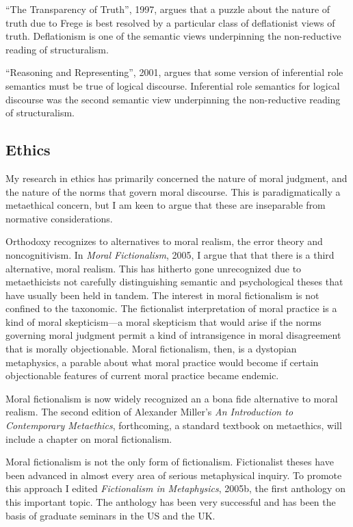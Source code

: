 \documentclass[contbibnum]{cv}
\begin{document}
``The Transparency of Truth'', 1997, argues that a puzzle about the nature of truth due to Frege is best resolved by a particular class of deflationist views of truth. Deflationism is one of the semantic views underpinning the non-reductive reading of structuralism.

``Reasoning and Representing'', 2001, argues that some version of inferential role semantics must be true of logical discourse. Inferential role semantics for logical discourse was the second semantic view underpinning the non-reductive reading of structuralism.


\subsection{Ethics}\label{sub:ethics} %

My research in ethics has primarily concerned the nature of moral judgment, and the nature of the norms that govern moral discourse. This is paradigmatically a metaethical concern, but I am keen to argue that these are inseparable from normative considerations.

Orthodoxy recognizes to alternatives to moral realism, the error theory and noncognitivism. In \emph{Moral Fictionalism}, 2005, I argue that that there is a third alternative, moral realism. This has hitherto gone unrecognized due to metaethicists not carefully distinguishing semantic and psychological theses that have usually been held in tandem. The interest in moral fictionalism is not confined to the taxonomic. The fictionalist interpretation of moral practice is a kind of moral skepticism---a moral skepticism that would arise if the norms governing moral judgment permit a kind of intransigence in moral disagreement that is morally objectionable. Moral fictionalism, then, is a dystopian metaphysics, a parable about what moral practice would become if certain objectionable features of current moral practice became endemic. 

Moral fictionalism is now widely recognized an a bona fide alternative to moral realism. The second edition of Alexander Miller's \emph{An Introduction to Contemporary Metaethics}, forthcoming, a standard textbook on metaethics, will include a chapter on moral fictionalism.

Moral fictionalism is not the only form of fictionalism. Fictionalist theses have been advanced in almost every area of serious metaphysical inquiry. To promote this approach I edited \emph{Fictionalism in Metaphysics}, 2005b, the first anthology on this important topic. The anthology has been very successful and has been the basis of graduate seminars in the US and the UK.
\end{document}
